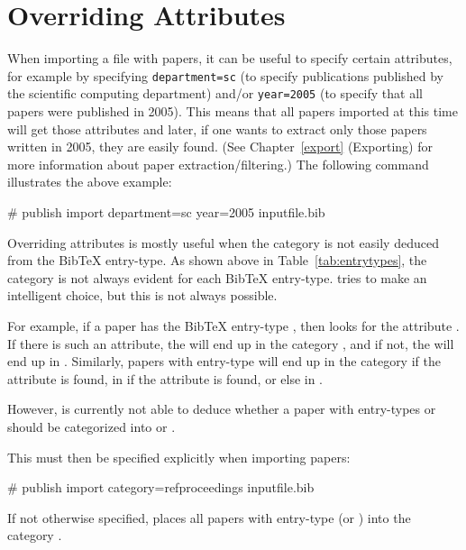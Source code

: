 \section{Overriding Attributes}

When importing a file with papers, it can be useful to specify certain
attributes, for example by specifying \texttt{department=sc} (to
specify publications published by the scientific computing department)
and/or \texttt{year=2005} (to specify that all papers were published
in 2005). This means that all papers imported at this time will get
those attributes and later, if one wants to extract only those papers
written in 2005, they are easily found. (See Chapter~\ref{export}
(Exporting) for more information about paper extraction/filtering.)
The following command illustrates the above example:

\begin{code}
# publish import department=sc year=2005 inputfile.bib
\end{code}

Overriding attributes is mostly useful when the category is not easily
deduced from the BibTeX entry-type. As shown above in
Table~\ref{tab:entrytypes}, the category is not always evident for each
BibTeX entry-type. \package{} tries to make an intelligent choice, but
this is not always possible.

For example, if a paper has the BibTeX entry-type , then
\package{} looks for the attribute . If there is such an
attribute, the  will end up in the category ,
and if not, the  will end up in . Similarly,
papers with entry-type  will end up in the category
 if the attribute  is found, in  if
the attribute  is found, or else in .

However, \package{} is currently not able to deduce whether a paper
with entry-types  or  should be
categorized into  or .

This must then be specified explicitly when importing papers:
\begin{code}
# publish import category=refproceedings inputfile.bib
\end{code}
If not otherwise specified, \package{} places all papers with entry-type
 (or ) into the category
.
